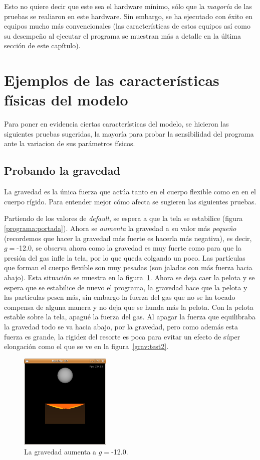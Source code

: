 Esto no quiere decir que este sea el hardware mínimo, sólo que la \emph{mayoría} de las pruebas se realiaron en este hardware. Sin embargo, se ha ejecutado con éxito en equipos mucho más convencionales (las características de estos equipos así como su desempeño al ejecutar el programa se muestran más a detalle en la última sección de este capítulo).

\section{Ejemplos de las características físicas del modelo}
Para poner en evidencia ciertas características del modelo, se hicieron las siguientes pruebas sugeridas, la mayoría para probar la sensibilidad del programa ante la variacion de sus parámetros físicos.

\subsection{Probando la gravedad}
La gravedad es la única fuerza que actúa tanto en el cuerpo flexible como en en el cuerpo rígido. Para entender mejor cómo afecta se sugieren las siguientes pruebas.

Partiendo de los valores de \emph{\foreignlanguage{english}{default}}, se espera a que la tela se estabilice (figura \ref{programa:portada}). Ahora se \emph{aumenta} la gravedad a su valor más \emph{pequeño} (recordemos que hacer la gravedad más fuerte es hacerla más negativa), es decir, $g=$-12.0, se observa ahora como la gravedad es muy fuerte como para que la presión del gas infle la tela, por lo que queda colgando un poco. Las partículas que forman el cuerpo flexible son muy pesadas (son jaladas con más fuerza hacia abajo). Esta situación se muestra en la figura~\ref{grav:test1}. Ahora se deja caer la pelota y se espera que se estabilice de nuevo el programa, la gravedad hace que la pelota y las partículas pesen más, sin embargo la fuerza del gas que no se ha tocado compensa de alguna manera y no deja que se hunda más la pelota. Con la pelota estable sobre la tela, apagué la fuerza del gas. Al apagar la fuerza que equilibraba la gravedad todo se va hacia abajo, por la gravedad, pero como además esta fuerza es grande, la rigidez del resorte es poca para evitar un efecto de súper elongación como el que se ve en la figura~\ref{grav:test2}.

\begin{figure}
 \centering
 \includegraphics[]{Img/modGra1}
 \caption[Ejecución con $g=$-12.0]{La gravedad aumenta a $g=$-12.0.}
 \label{grav:test1}
\end{figure}

